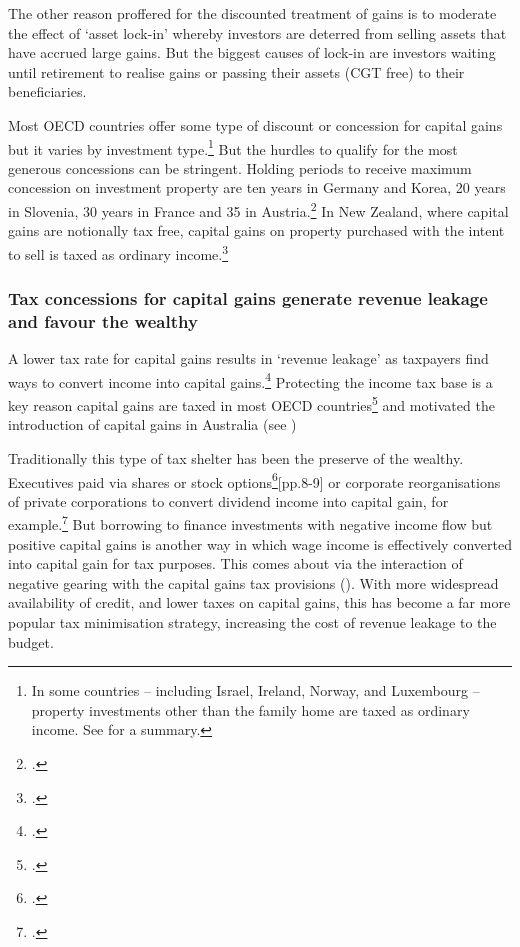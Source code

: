 \documentclass{grattan}\usepackage[]{graphicx}\usepackage[]{color}
\begin{document}
The other reason proffered for the discounted treatment of gains is to moderate the effect of `asset lock-in' whereby investors are deterred from selling assets that have accrued large gains. But the biggest causes of lock-in are investors waiting until retirement to realise gains or passing their assets (CGT free) to their beneficiaries. 

Most OECD countries offer some type of discount or concession for capital gains but it varies by investment type.\footnote{In some countries -- including Israel, Ireland, Norway, and Luxembourg -- property investments other than the family home are taxed as ordinary income. See \textcite{Harding2013} for a summary.}  But the hurdles to qualify for the most generous concessions can be stringent. Holding periods to receive maximum concession on investment property are ten years in Germany and Korea, 20 years in Slovenia, 30 years in France and 35 in Austria.\footcite{Harding2013} In New Zealand, where capital gains are notionally tax free, capital gains on property purchased with the intent to sell is taxed as ordinary income.\footcite[p.~25]{prebble2010tax} 
  
\subsubsection{Tax concessions for capital gains generate revenue leakage and favour the wealthy}
A lower tax rate for capital gains results in `revenue leakage' as taxpayers find ways to convert income into capital gains.\footcites{Evans2005}{Minas2013}  Protecting the income tax base is a key reason capital gains are taxed in most OECD countries\footcite{OECD2006b} and motivated the introduction of capital gains in Australia (see )

Traditionally this type of tax shelter has been the preserve of the wealthy. Executives paid via shares or stock options\footcite{Ingles2009}[pp.8-9] or corporate reorganisations of private corporations to convert dividend income into capital gain, for example.\footcite{Minas2013} But borrowing to finance investments with negative income flow but positive capital gains is another way in which wage income is effectively converted into capital gain for tax purposes. This comes about via the interaction of negative gearing with the capital gains tax provisions (). With more widespread availability of credit, and lower taxes on capital gains, this has become a far more popular tax minimisation strategy, increasing the cost of revenue leakage to the budget.
\end{document}
